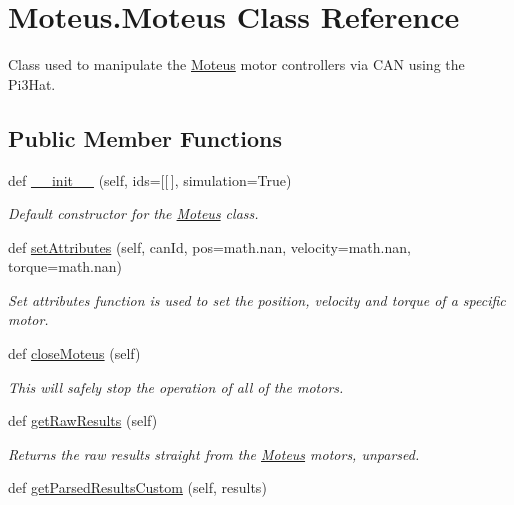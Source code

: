 \hypertarget{classMoteus_1_1Moteus}{}\section{Moteus.\+Moteus Class Reference}
\label{classMoteus_1_1Moteus}


Class used to manipulate the \hyperlink{classMoteus_1_1Moteus}{Moteus} motor controllers via C\+AN using the Pi3\+Hat.  


\subsection*{Public Member Functions}
\begin{DoxyCompactItemize}
\item 
def \hyperlink{classMoteus_1_1Moteus_a9ef12c6e83e497055dd6ee037808dc30}{\+\_\+\+\_\+init\+\_\+\+\_\+} (self, ids=\mbox{[}\mbox{[}$\,$\mbox{]}, simulation=True)
\begin{DoxyCompactList}\small\item\em Default constructor for the \hyperlink{classMoteus_1_1Moteus}{Moteus} class. \end{DoxyCompactList}\item 
def \hyperlink{classMoteus_1_1Moteus_a75698a813e2463f3c245a4b7fa07b2a0}{set\+Attributes} (self, can\+Id, pos=math.\+nan, velocity=math.\+nan, torque=math.\+nan)
\begin{DoxyCompactList}\small\item\em Set attributes function is used to set the position, velocity and torque of a specific motor. \end{DoxyCompactList}\item 
def \hyperlink{classMoteus_1_1Moteus_a2e5bafddee5cfb9833f14ebf5e12f354}{close\+Moteus} (self)
\begin{DoxyCompactList}\small\item\em This will safely stop the operation of all of the motors. \end{DoxyCompactList}\item 
def \hyperlink{classMoteus_1_1Moteus_aa9dc57d842421f50e803f4aa908a924e}{get\+Raw\+Results} (self)
\begin{DoxyCompactList}\small\item\em Returns the raw results straight from the \hyperlink{classMoteus_1_1Moteus}{Moteus} motors, unparsed. \end{DoxyCompactList}\item 
def \hyperlink{classMoteus_1_1Moteus_abb96e640583834610ef847305d02576f}{get\+Parsed\+Results\+Custom} (self, results)

\end{DoxyCompactItemize}
